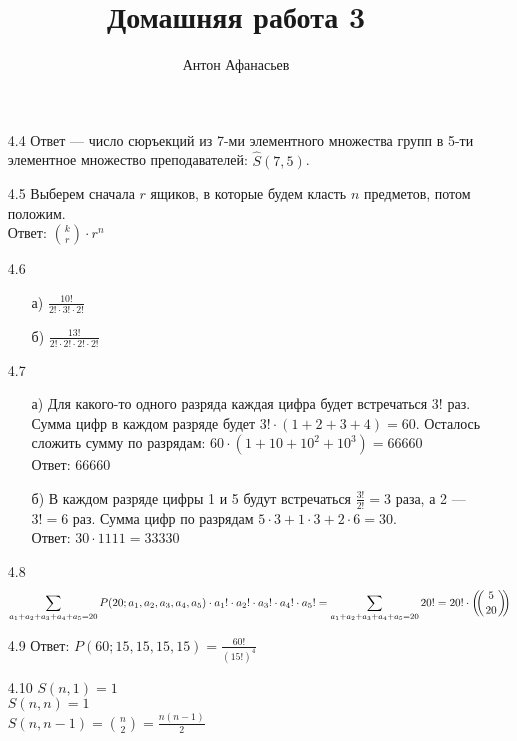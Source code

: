 \documentclass[10pt]{article}
\newcommand{\rchoose}[2]{\left(\mkern-6mu \left({#1 \atop #2}\right) \mkern-6mu \right)}
\begin{document}
\title{Домашняя работа 3}
\author{Антон Афанасьев}
\maketitle

\begin{enumerate}[label*=4.\arabic*]
	\item[4.4] Ответ --- число сюръекций из 7-ми элементного множества групп в 5-ти элементное множество преподавателей: $\hat S (7, 5)$.
	
	\item[4.5] Выберем сначала $r$ ящиков, в которые будем класть $n$ предметов, потом положим.\\
	Ответ: $ \binom{k}{r} \cdot r^n$
	
	\item[4.6]
	\begin{itemize}
		\item[а)] $\frac{10!}{2! \cdot 3! \cdot 2!}$
		\item[б)] $\frac{13!}{2! \cdot 2! \cdot 2! \cdot 2!}$
	\end{itemize}
	
	\item[4.7]
	\begin{itemize}
		\item[а)] Для какого-то одного разряда каждая цифра будет встречаться $3!$ раз. Сумма цифр в каждом разряде будет $3! \cdot (1+2+3+4) = 60$. Осталось сложить сумму по разрядам: $60 \cdot (1 + 10 + 10^2 +10^3) = 66660$\\
		Ответ: 66660
		\item[б)] В каждом разряде цифры 1 и 5 будут встречаться $\frac{3!}{2!} = 3$ раза, а 2 --- $3! = 6$ раз. Сумма цифр по разрядам $5 \cdot 3 + 1 \cdot 3 + 2 \cdot 6 = 30$.\\
		Ответ: $30 \cdot 1111 = 33330$
	\end{itemize}
	
	\item[4.8] 
	$$\sum_{a_1+a_2+a_3+a_4+a_5 = 20} P(20; a_1, a_2, a_3, a_4, a_5) \cdot a_1! \cdot a_2! \cdot a_3! \cdot a_4! \cdot a_5! = \sum_{a_1+a_2+a_3+a_4+a_5 = 20} 20! = 20! \cdot \rchoose{5}{20}$$
	
	\item[4.9] Ответ: $P(60; 15, 15, 15, 15) = \frac{60!}{(15!)^4}$
	
	\item[4.10] $S(n, 1) = 1$\\
		$S(n, n) = 1$\\
		$S(n, n-1) = \binom{n}{2} = \frac{n(n-1)}{2}$
\end{enumerate}
\end{document}
